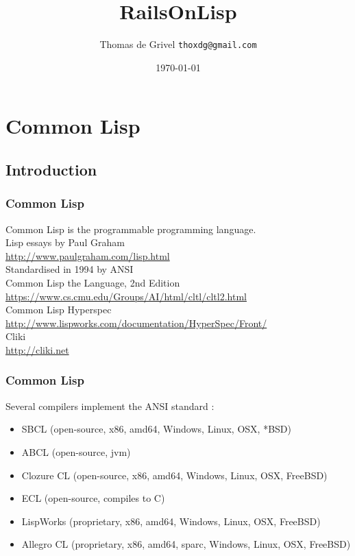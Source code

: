 \documentclass[8pt]{beamer}
\title{RailsOnLisp}
\author{Thomas de Grivel {\tt thoxdg@gmail.com}}
\institute{http://kmx.io}
\date{\today}
\begin{document}
\begin{frame}
\titlepage
\end{frame}

\section{Common Lisp}
\subsection{Introduction}

\begin{frame}
  \frametitle{Common Lisp}
  Common Lisp is the programmable programming language. \\
  \vspace{1em}
  Lisp essays by Paul Graham \\
  \url{http://www.paulgraham.com/lisp.html} \\
  \vspace{1em}
  Standardised in 1994 by ANSI \\
  \vspace{1em}
  Common Lisp the Language, 2nd Edition \\
  \url{https://www.cs.cmu.edu/Groups/AI/html/cltl/cltl2.html} \\
  \vspace{1em}
  Common Lisp Hyperspec \\
  \url{http://www.lispworks.com/documentation/HyperSpec/Front/} \\
  Cliki \\
  \url{http://cliki.net}
\end{frame}

\begin{frame}
  \frametitle{Common Lisp}
  Several compilers implement the ANSI standard :
  \begin{itemize}
  \item SBCL (open-source, x86, amd64, Windows, Linux, OSX, *BSD)
  \item ABCL (open-source, jvm)
  \item Clozure CL (open-source, x86, amd64, Windows, Linux, OSX, FreeBSD)
  \item ECL (open-source, compiles to C)
  \item LispWorks (proprietary, x86, amd64, Windows, Linux, OSX, FreeBSD)
  \item Allegro CL (proprietary, x86, amd64, sparc, Windows, Linux, OSX, FreeBSD)
  \end{itemize}
\end{frame}
\end{document}
